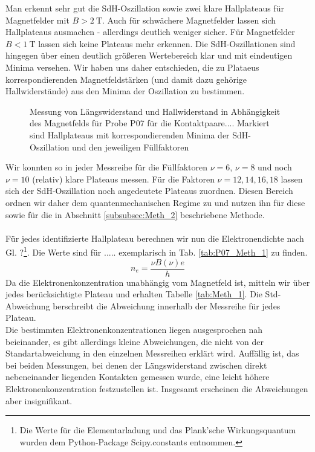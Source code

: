 Man erkennt sehr gut die SdH-Oszillation sowie zwei klare Hallplateaus für Magnetfelder mit $B>\SI{2}{\tesla}$. Auch für schwächere Magnetfelder lassen sich Hallplateaus ausmachen - allerdings deutlich weniger sicher. Für Magnetfelder $B<\SI{1}{\tesla}$ lassen sich keine Plateaus mehr erkennen. Die SdH-Oszillationen sind hingegen über einen deutlich größeren Wertebereich klar und mit eindeutigen Minima versehen. Wir haben uns daher entschieden, die zu Plataeus korrespondierenden Magnetfeldstärken (und damit dazu gehörige Hallwiderstände) aus den Minima der Oszillation zu bestimmen.

\begin{figure}[h!]
	\centering
	
	\caption{Messung von Längswiderstand und Hallwiderstand in Abhängigkeit des Magnetfelds für Probe P07 für die Kontaktpaare.... Markiert sind Hallplateaus mit korrespondierenden Minima der SdH-Oszillation und den jeweiligen Füllfaktoren}
	\label{abb:P07_Meth_1}
\end{figure}

Wir konnten so in jeder Messreihe für die Füllfaktoren $\nu = 6$, $\nu = 8$ und noch $\nu = 10 $ (relativ) klare Plateaus messen. Für die Faktoren $\nu = 12, 14, 16, 18$ lassen sich der SdH-Oszillation noch angedeutete Plateaus zuordnen. Diesen Bereich ordnen wir daher dem quantenmechanischen Regime zu und nutzen ihn für diese sowie für die in Abschnitt \ref{subsubsec:Meth_2} beschriebene Methode. \\
\\
Für jedes identifizierte Hallplateau berechnen wir nun die Elektronendichte nach Gl. ?\footnote{Die Werte für die Elementarladung und das Plank'sche Wirkungsquantum wurden dem Python-Package Scipy.constants entnommen.}. Die Werte sind für ..... exemplarisch in Tab. \ref{tab:P07_Meth_1} zu finden. 
$$ n_e = \frac{\nu B(\nu) e}{h}$$
Da die Elektronenkonzentration unabhängig vom Magnetfeld ist, mitteln wir über jedes berücksichtigte Plateau und erhalten Tabelle \ref{tab:Meth_1}. Die Std-Abweichung berschreibt die Abweichung innerhalb der Messreihe für jedes Plateau. \\ 

Die bestimmten Elektronenkonzentrationen liegen ausgesprochen nah beieinander, es gibt allerdings kleine Abweichungen, die nicht von der Standartabweichung in den einzelnen Messreihen erklärt wird. Auffällig ist, das bei beiden Messungen, bei denen der Längswiderstand zwischen direkt nebeneinander liegenden Kontakten gemessen wurde, eine leicht höhere Elektronenkonzentration festzustellen ist. Insgesamt erscheinen die Abweichungen aber insignifikant. \\

